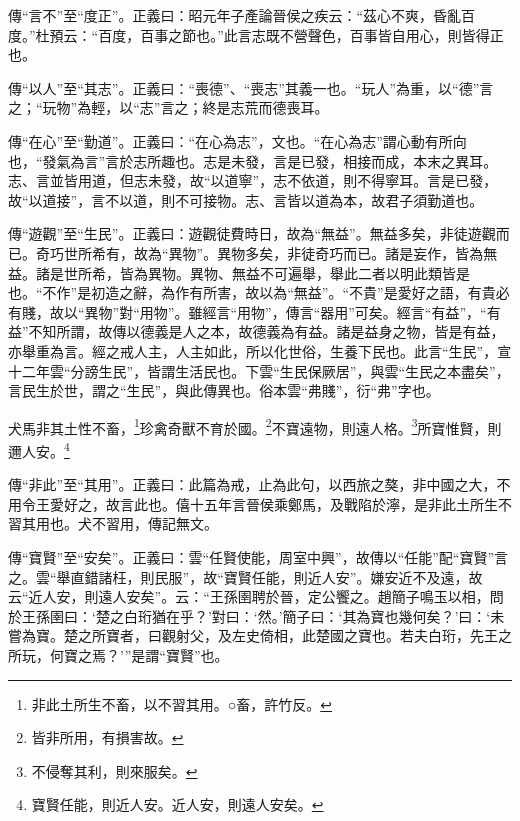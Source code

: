 {\noindent\zhuan{}\fzbyks 傳“言不”至“度正”。正義曰：昭元年子產論晉侯之疾云：“茲心不爽，昏亂百度。”杜預云：“百度，百事之節也。”此言志既不營聲色，百事皆自用心，則皆得正也。 \par}

{\noindent\zhuan{}\fzbyks 傳“以人”至“其志”。正義曰：“喪德”、“喪志”其義一也。“玩人”為重，以“德”言之；“玩物”為輕，以“志”言之；終是志荒而德喪耳。 \par}

{\noindent\zhuan{}\fzbyks 傳“在心”至“勤道”。正義曰：“在心為志”，文也。“在心為志”謂心動有所向也，“發氣為言”言於志所趣也。志是未發，言是已發，相接而成，本末之異耳。志、言並皆用道，但志未發，故“以道寧”，志不依道，則不得寧耳。言是已發，故“以道接”，言不以道，則不可接物。志、言皆以道為本，故君子須勤道也。 \par}

{\noindent\zhuan{}\fzbyks 傳“遊觀”至“生民”。正義曰：遊觀徒費時日，故為“無益”。無益多矣，非徒遊觀而已。奇巧世所希有，故為“異物”。異物多矣，非徒奇巧而已。諸是妄作，皆為無益。諸是世所希，皆為異物。異物、無益不可遍舉，舉此二者以明此類皆是也。“不作”是初造之辭，為作有所害，故以為“無益”。“不貴”是愛好之語，有貴必有賤，故以“異物”對“用物”。雖經言“用物”，傳言“器用”可矣。經言“有益”，“有益”不知所謂，故傳以德義是人之本，故德義為有益。諸是益身之物，皆是有益，亦舉重為言。經之戒人主，人主如此，所以化世俗，生養下民也。此言“生民”，宣十二年雲“分謗生民”，皆謂生活民也。下雲“生民保厥居”，與雲“生民之本盡矣”，言民生於世，謂之“生民”，與此傳異也。俗本雲“弗賤”，衍“弗”字也。 \par}

犬馬非其土性不畜，\footnote{非此土所生不畜，以不習其用。○畜，許竹反。}珍禽奇獸不育於國。\footnote{皆非所用，有損害故。}不寶遠物，則遠人格。\footnote{不侵奪其利，則來服矣。}所寶惟賢，則邇人安。\footnote{寶賢任能，則近人安。近人安，則遠人安矣。}

{\noindent\zhuan{}\fzbyks 傳“非此”至“其用”。正義曰：此篇為戒，止為此句，以西旅之獒，非中國之大，不用令王愛好之，故言此也。僖十五年言晉侯乘鄭馬，及戰陷於濘，是非此土所生不習其用也。犬不習用，傳記無文。 \par}

{\noindent\zhuan{}\fzbyks 傳“寶賢”至“安矣”。正義曰：雲“任賢使能，周室中興”，故傳以“任能”配“寶賢”言之。雲“舉直錯諸枉，則民服”，故“寶賢任能，則近人安”。嫌安近不及遠，故云“近人安，則遠人安矣”。云：“王孫圉聘於晉，定公饗之。趙簡子鳴玉以相，問於王孫圉曰：‘楚之白珩猶在乎？’對曰：‘然。’簡子曰：‘其為寶也幾何矣？’曰：‘未嘗為寶。楚之所寶者，曰觀射父，及左史倚相，此楚國之寶也。若夫白珩，先王之所玩，何寶之焉？’”是謂“寶賢”也。 \par}

